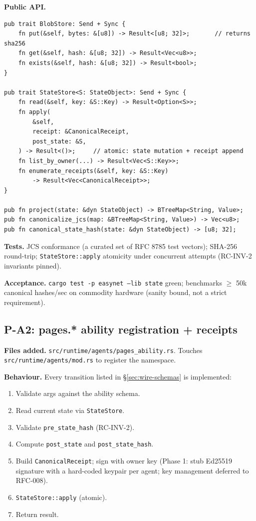 \documentclass[11pt,a4paper]{article}
\theoremstyle{definition}
\begin{document}
\textbf{Public API.}
\begin{lstlisting}
pub trait BlobStore: Send + Sync {
    fn put(&self, bytes: &[u8]) -> Result<[u8; 32]>;       // returns sha256
    fn get(&self, hash: &[u8; 32]) -> Result<Vec<u8>>;
    fn exists(&self, hash: &[u8; 32]) -> Result<bool>;
}

pub trait StateStore<S: StateObject>: Send + Sync {
    fn read(&self, key: &S::Key) -> Result<Option<S>>;
    fn apply(
        &self,
        receipt: &CanonicalReceipt,
        post_state: &S,
    ) -> Result<()>;     // atomic: state mutation + receipt append
    fn list_by_owner(...) -> Result<Vec<S::Key>>;
    fn enumerate_receipts(&self, key: &S::Key)
        -> Result<Vec<CanonicalReceipt>>;
}

pub fn project(state: &dyn StateObject) -> BTreeMap<String, Value>;
pub fn canonicalize_jcs(map: &BTreeMap<String, Value>) -> Vec<u8>;
pub fn canonical_state_hash(state: &dyn StateObject) -> [u8; 32];
\end{lstlisting}

\textbf{Tests.} JCS conformance (a curated set of RFC 8785 test
vectors); SHA-256 round-trip; \texttt{StateStore::apply}
atomicity under concurrent attempts (RC-INV-2 invariants pinned).

\textbf{Acceptance.} \texttt{cargo test -p easynet --lib state}
green; benchmarks $\geq$ 50k canonical hashes/sec on commodity
hardware (sanity bound, not a strict requirement).

\subsection{P-A2: pages.* ability registration + receipts}

\textbf{Files added.} \texttt{src/runtime/agents/pages\_ability.rs}.
Touches \texttt{src/runtime/agents/mod.rs} to register the
namespace.

\textbf{Behaviour.} Every transition listed in
\S\ref{sec:wire-schemas} is implemented:
\begin{enumerate}[leftmargin=2.2em,itemsep=0.15em]
    \item Validate args against the ability schema.
    \item Read current state via \texttt{StateStore}.
    \item Validate \texttt{pre\_state\_hash} (RC-INV-2).
    \item Compute \texttt{post\_state} and \texttt{post\_state\_hash}.
    \item Build \texttt{CanonicalReceipt}; sign with owner key
    (Phase 1: stub Ed25519 signature with a hard-coded keypair
    per agent; key management deferred to RFC-008).
    \item \texttt{StateStore::apply} (atomic).
    \item Return result.
\end{enumerate}
\end{document}
